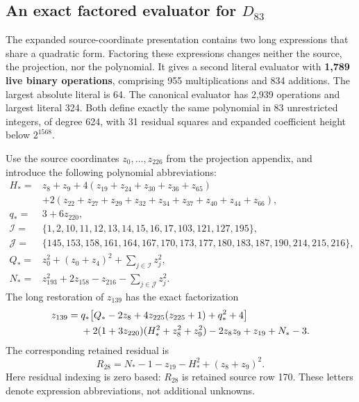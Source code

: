 \subsection{An exact factored evaluator for $D_{83}$}
\label{sec:factored-evaluator}

The expanded source-coordinate presentation contains two long expressions
that share a quadratic form. Factoring these expressions changes neither
the source, the projection, nor the polynomial. It gives a second literal
evaluator with \textbf{1,789 live binary operations}, comprising 955
multiplications and 834 additions. The largest absolute literal is 64.
The canonical evaluator has 2,939 operations and largest literal 324.
Both define exactly the same polynomial in 83 unrestricted integers, of
degree 624, with 31 residual squares and expanded coefficient height below
$2^{1568}$.

Use the source coordinates $z_0,\ldots,z_{226}$ from the projection appendix,
and introduce the following polynomial abbreviations:
\begin{align*}
 H_*={}&z_8+z_9+4(z_{19}+z_{24}+z_{30}+z_{36}+z_{65})\\
       &+2(z_{22}+z_{27}+z_{29}+z_{32}+z_{34}
                    +z_{37}+z_{40}+z_{44}+z_{66}),\\
 q_*={}&3+6z_{220},\\
 \mathcal I={}&\{1,2,10,11,12,13,14,15,16,17,103,121,127,195\},\\
 \mathcal J={}&\{145,153,158,161,164,167,170,173,
                  177,180,183,187,190,214,215,216\},\\
 Q_*={}&z_0^2+(z_0+z_4)^2+\sum_{j\in\mathcal I}z_j^2,\\
 N_*={}&z_{193}^2+2z_{158}-z_{216}-\sum_{j\in\mathcal J}z_j^2.
\end{align*}
The long restoration of $z_{139}$ has the exact factorization
\begin{align}
 z_{139}={}&
 q_*\bigl[Q_*-2z_8+4z_{225}(z_{225}+1)+q_*^2+4\bigr]\notag\\
 &+2(1+3z_{220})(H_*^2+z_8^2+z_9^2)
       -2z_8z_9+z_{19}+N_*-3.\label{eq:factored-z139}
\end{align}
The corresponding retained residual is
\begin{equation}
 R_{28}=N_*-1-z_{19}-H_*^2+(z_8+z_9)^2.
 \label{eq:factored-R28}
\end{equation}
Here residual indexing is zero based: $R_{28}$ is retained source row 170.
These letters denote expression abbreviations, not additional unknowns.

